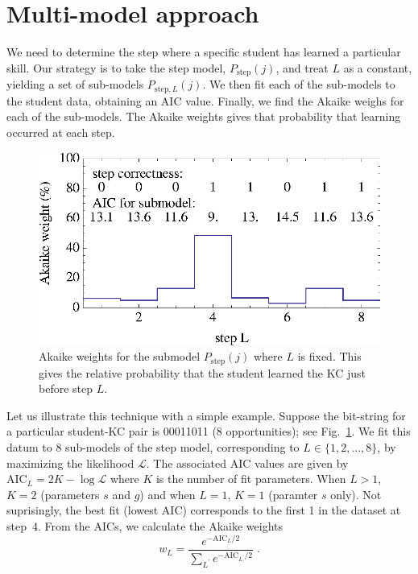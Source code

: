 \documentclass[11pt,letterpaper]{article}
\begin{document}
\section{Multi-model approach}
\label{multi-model}

We need to determine the step where a specific student has learned a
particular skill.  Our strategy is to take the step model, 
$P_\mathrm{step}(j)$, and treat $L$ as a constant, yielding a set of 
sub-models $P_{\mathrm{step},L}(j)$.
We then fit each of the sub-models to the student data, obtaining an
AIC value.  Finally, we find the Akaike weighs for each of the
sub-models.  The Akaike weights gives that probability that learning
occurred at each step.

\begin{figure}
  \centering \includegraphics{step-weights.eps}
   \caption{Akaike weights for the submodel $P_\mathrm{step}(j)$
      where $L$ is fixed.  This gives the relative probability that
      the student learned the KC just before step $L$.}
    \label{step-weights}
\end{figure}

Let us illustrate this technique with a simple example. 
Suppose the bit-string for a particular student-KC pair is 
00011011 (8 opportunities); see Fig.~\ref{step-weights}.
We fit this datum to 8 sub-models of the step model, corresponding to
$L\in\{1,2,\ldots,8\}$, by maximizing the likelihood $\mathcal{L}$.  
The associated AIC values are
given by $\mathrm{AIC}_L=2 K-\log \mathcal{L}$  where $K$ is the
number of fit parameters.  When $L>1$, $K=2$  (parameters $s$ and $g$) and 
when $L=1$, $K=1$ (paramter $s$ only).
%
%
Not suprisingly, the best fit (lowest AIC) corresponds to the first
1 in the dataset at step~4.  From the AICs, we calculate the Akaike weights
%
\begin{equation}
     w_L=\frac{e^{-\mathrm{AIC}_L/2} }{\sum_{L^\prime}
       e^{-\mathrm{AIC}_{L^\prime}/2}} \; .
\end{equation}
%
\end{document}
